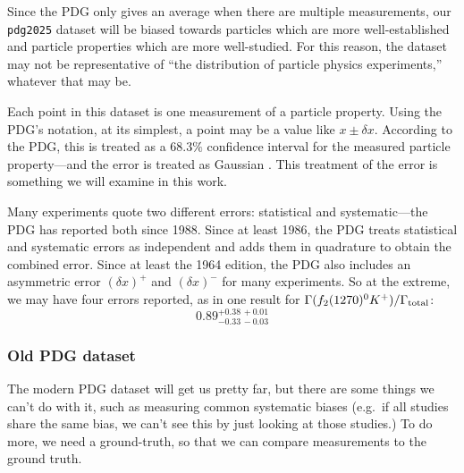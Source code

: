 \documentclass[12pt]{article}
\begin{document}
Since the PDG only gives an average when there are multiple measurements, our \texttt{pdg2025} dataset will be biased towards particles which are more well-established and particle properties which are more well-studied. For this reason, the dataset may not be representative of ``the distribution of particle physics experiments,'' whatever that may be.

Each point in this dataset is one measurement of a particle property. Using the PDG's notation, at its simplest, a point may be a value like $x\pm\delta x$. According to the PDG, this is treated as a $68.3\%$ confidence interval for the measured particle property---and the error is treated as Gaussian \citep[sec.~5.2.1]{navas2024review}. This treatment of the error is something we will examine in this work.

Many experiments quote two different errors: statistical and systematic---the PDG has reported both since 1988. Since at least 1986, the PDG treats statistical and systematic errors as independent and adds them in quadrature to obtain the combined error. Since at least the 1964 edition, the PDG also includes an asymmetric error $(\delta x)^+$ and $(\delta x)^-$ for many experiments. So at the extreme, we may have four errors reported, as in one result for $\Gamma(f_2(1270)^0K^+)/\Gamma_{\rm{total}}$:
\[0.89^{+0.38\,+0.01}_{-0.33\,-0.03}\]


\subsubsection{Old PDG dataset}

The modern PDG dataset will get us pretty far, but there are some things we can't do with it, such as measuring common systematic biases (e.g.~if all studies share the same bias, we can't see this by just looking at those studies.) To do more, we need a ground-truth, so that we can compare measurements to the ground truth.
\end{document}
